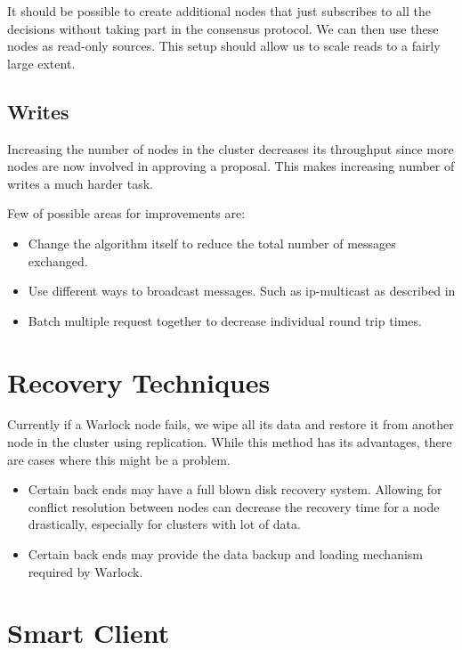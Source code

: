 It should be possible to create additional nodes that just subscribes to all
the decisions without taking part in the consensus protocol. We can then use
these nodes as read-only sources. This setup should allow us to scale reads
to a fairly large extent.

\subsection{Writes}

Increasing the number of nodes in the cluster decreases its throughput since
more nodes are now involved in approving a proposal. This makes increasing
number of writes a much harder task.

Few of possible areas for improvements are:

\begin{itemize}
  \item Change the algorithm itself to reduce the total number of messages
    exchanged.
  \item Use different ways to broadcast messages. Such as ip-multicast as
    described in \citet{MarandiPSP10}
  \item Batch multiple request together to decrease individual round trip times.
\end{itemize}

\section{Recovery Techniques}

Currently if a Warlock node fails, we wipe all its data and restore it from
another node in the cluster using replication. While this method has its
advantages, there are cases where this might be a problem.

\begin{itemize}
  \item Certain back ends may have a full blown disk recovery system.
    Allowing for conflict resolution between nodes can decrease the
    recovery time for a node drastically, especially for clusters
    with lot of data.
  \item Certain back ends may provide the data backup and loading mechanism
    required by Warlock.
\end{itemize}

\section{Smart Client}

